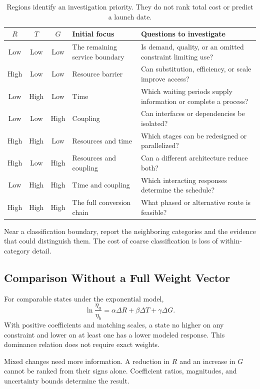 \documentclass[11pt,openany]{book}
\begin{document}
\begin{table}[ht]
\centering\small
\begin{tabularx}{\textwidth}{@{}cccYY@{}}
\toprule
$R$ & $T$ & $G$ & Initial focus & Questions to investigate\\
\midrule
Low & Low & Low & The remaining service boundary & Is demand, quality, or an omitted constraint limiting use?\\
High & Low & Low & Resource barrier & Can substitution, efficiency, or scale improve access?\\
Low & High & Low & Time & Which waiting periods supply information or complete a process?\\
Low & Low & High & Coupling & Can interfaces or dependencies be isolated?\\
High & High & Low & Resources and time & Which stages can be redesigned or parallelized?\\
High & Low & High & Resources and coupling & Can a different architecture reduce both?\\
Low & High & High & Time and coupling & Which interacting responses determine the schedule?\\
High & High & High & The full conversion chain & What phased or alternative route is feasible?\\
\bottomrule
\end{tabularx}
\caption{Regions identify an investigation priority. They do not rank total cost or predict a launch date.}
\end{table}

Near a classification boundary, report the neighboring categories and the evidence that could distinguish them. The cost of coarse classification is loss of within-category detail.

\subsection{Comparison Without a Full Weight Vector}

For comparable states under the exponential model,
\begin{equation}
 \ln\frac{\eta_a}{\eta_b}
 =\alpha\Delta R+\beta\Delta T+\gamma\Delta G.
\end{equation}
With positive coefficients and matching scales, a state no higher on any constraint and lower on at least one has a lower modeled response. This dominance relation does not require exact weights.

Mixed changes need more information. A reduction in $R$ and an increase in $G$ cannot be ranked from their signs alone. Coefficient ratios, magnitudes, and uncertainty bounds determine the result.
\end{document}
